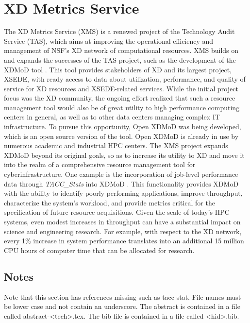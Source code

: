 \section{XD Metrics Service}

The XD Metrics Service (XMS) \cite{hid-sample-vonLaszewski15tas} is a
renewed project of the Technology Audit Service (TAS), which aims at
improving the operational efficiency and management of NSF's XD
network of computational resources. XMS builds on and expands the
successes of the TAS project, such as the development of the XDMoD
tool . This tool provides stakeholders of XD and its
largest project, XSEDE, with ready access to data about utilization,
performance, and quality of service for XD resources and XSEDE-related
services. While the initial project focus was the XD community, the
ongoing effort realized that such a resource management tool would
also be of great utility to high performance computing centers in
general, as well as to other data centers managing complex IT
infrastructure. To pursue this opportunity, Open XDMoD was being
developed, which is an open source version of the tool. Open XDMoD is
already in use by numerous academic and industrial HPC centers. The
XMS project expands XDMoD beyond its original goals, so as to increase
its utility to XD and move it into the realm of a comprehensive
resource management tool for cyberinfrastructure. One example is the
incorporation of job-level performance data through {\em TACC\_Stats}
into XDMoD . This functionality provides XDMoD with
the ability to identify poorly performing applications, improve
throughput, characterize the system's workload, and provide metrics
critical for the specification of future resource acquisitions. Given
the scale of today's HPC systems, even modest increases in throughput
can have a substantial impact on science and engineering research. For
example, with respect to the XD network, every 1\% increase in system
performance translates into an additional 15 million CPU hours of
computer time that can be allocated for research.

\subsection{Notes}

Note that this section has references missing such as tacc-stat. File
names must be lower case and not contain an underscore. The abstract
is contained in a file called abstract-<tech>.tex. The bib file is
contained in a file called <hid>.bib.

